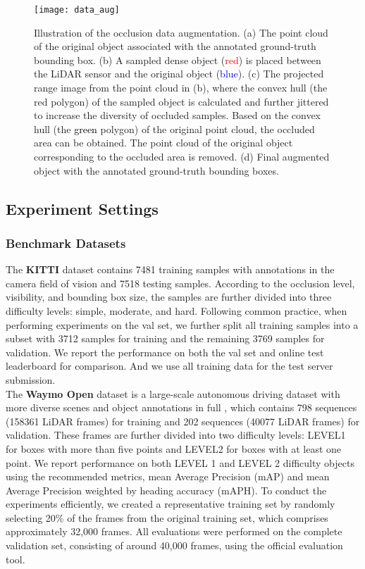 \documentclass[twocolumn]{svjour3}
\newcommand{\revise}[1]{\textcolor{black}{#1}}
\begin{document}
\begin{figure*}[htp]
\centering
\texttt{[image: data\_aug]}
\caption{Illustration of the occlusion data augmentation.
(a) The point cloud of the original object associated with the annotated ground-truth bounding box. (b) A sampled dense object (\textcolor{red}{red}) is placed between the LiDAR sensor and the original object (\textcolor{blue}{blue}). (c) The projected range image from the point cloud in (b), where the convex hull (the red polygon) of the sampled object is calculated and further jittered to increase the diversity of occluded samples. Based on the convex hull (the \revise{green} polygon) of the original point cloud, the occluded area can be obtained.
The point cloud of the original object corresponding to the occluded area is removed. (d) Final augmented object with the annotated ground-truth bounding boxes.}
\label{fig:data_aug}
\end{figure*}

\subsection{Experiment Settings} \label{experiment_settings}

\subsubsection{Benchmark Datasets} 
The \textbf{KITTI} dataset contains 7481 training samples with annotations in the camera field of vision and 7518 testing samples. According to the occlusion level, visibility, and bounding box size, the samples are further divided into three difficulty levels: simple, moderate, and hard. Following common practice, when performing experiments on the val set, we further split all training samples into a subset with 3712 samples for training and the remaining 3769 samples for validation. We report the performance on both the val set and online test leaderboard for comparison. And we use all training data for the test server submission.\\

\noindent The \textbf{Waymo Open} dataset is a large-scale autonomous driving dataset with more diverse scenes and object annotations in full , which contains 798 sequences (158361 LiDAR frames) for training and 202 sequences (40077 LiDAR frames) for validation. These frames are further divided into two difficulty levels: LEVEL1 for boxes with more than five points and LEVEL2 for boxes with at least one point.
We report performance on both LEVEL 1 and LEVEL 2 difficulty objects using the recommended metrics, mean Average Precision (mAP) and mean Average Precision weighted by heading accuracy (mAPH). To conduct the experiments efficiently, we created a representative training set by randomly selecting 20\% of the frames from the original training set, which comprises approximately 32,000 frames. All evaluations were performed on the complete validation set, consisting of around 40,000 frames, using the official evaluation tool.
\end{document}
